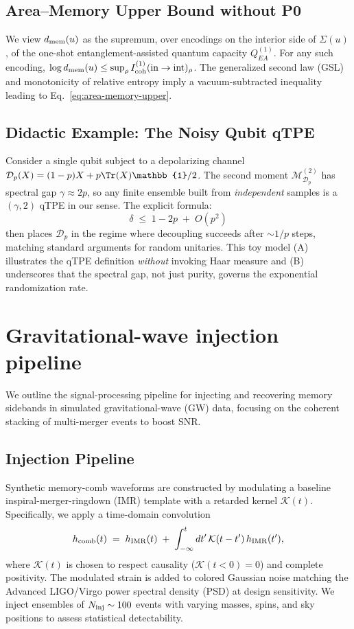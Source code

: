 \documentclass[aps,prd,preprint,onecolumn,superscriptaddress,nofootinbib,longbibliography,floatfix,11pt,showpacs,showkeys]{revtex4-2}
\theoremstyle{plain}
\theoremstyle{definition}
\theoremstyle{remark}
\begin{document}
\subsection{Area--Memory Upper Bound without P0}
We view $d_{\rm mem}(u)$ as the supremum, over encodings on the interior side of $\Sigma(u)$, of the one-shot entanglement-assisted quantum capacity $Q^{(1)}_{EA}$. For any such encoding, $\log d_{\rm mem}(u) \le \sup_\rho I^{(1)}_{\rm coh}(\text{in}\to\text{int})_\rho$. The generalized second law (GSL) and monotonicity of relative entropy imply a vacuum-subtracted inequality leading to Eq.~\eqref{eq:area-memory-upper}.

\subsection{Didactic Example: The Noisy Qubit qTPE}
\label{app:qtpe-didactic}
Consider a single qubit subject to a depolarizing channel $\mathcal{D}_p(X) = (1-p)X + p\Tr(X)\mathbb{1}/2$. The second moment $\mathcal{M}^{(2)}_{\mathcal{D}_p}$ has spectral gap $\gamma \approx 2p$, so any finite ensemble built from \textit{independent} samples is a $(\gamma,2)$ qTPE in our sense. The explicit formula:
\[
\delta \;\le\; 1 - 2p \;+\; O(p^2)
\]
then places $\mathcal{D}_p$ in the regime where decoupling succeeds after $\sim 1/p$ steps, matching standard arguments for random unitaries. This toy model (A) illustrates the qTPE definition \textit{without} invoking Haar measure and (B) underscores that the spectral gap, not just purity, governs the exponential randomization rate.


\section{Gravitational-wave injection pipeline}
We outline the signal-processing pipeline for injecting and recovering memory sidebands in simulated gravitational-wave (GW) data, focusing on the coherent stacking of multi-merger events to boost SNR.
\subsection{Injection Pipeline}
Synthetic memory-comb waveforms are constructed by modulating a baseline inspiral-merger-ringdown (IMR) template with a retarded kernel $\mathcal{K}(t)$. Specifically, we apply a time-domain convolution
\begin{equation}
h_{\rm comb}(t)\;=\;h_{\rm IMR}(t)\;+\;\int_{-\infty}^t dt'\,\mathcal{K}(t-t')\,h_{\rm IMR}(t'),
\end{equation}
where $\mathcal{K}(t)$ is chosen to respect causality ($\mathcal{K}(t<0)=0$) and complete positivity. The modulated strain is added to colored Gaussian noise matching the Advanced LIGO/Virgo power spectral density (PSD) at design sensitivity. We inject ensembles of $N_{\rm inj}\sim 100$ events with varying masses, spins, and sky positions to assess statistical detectability.
\end{document}
